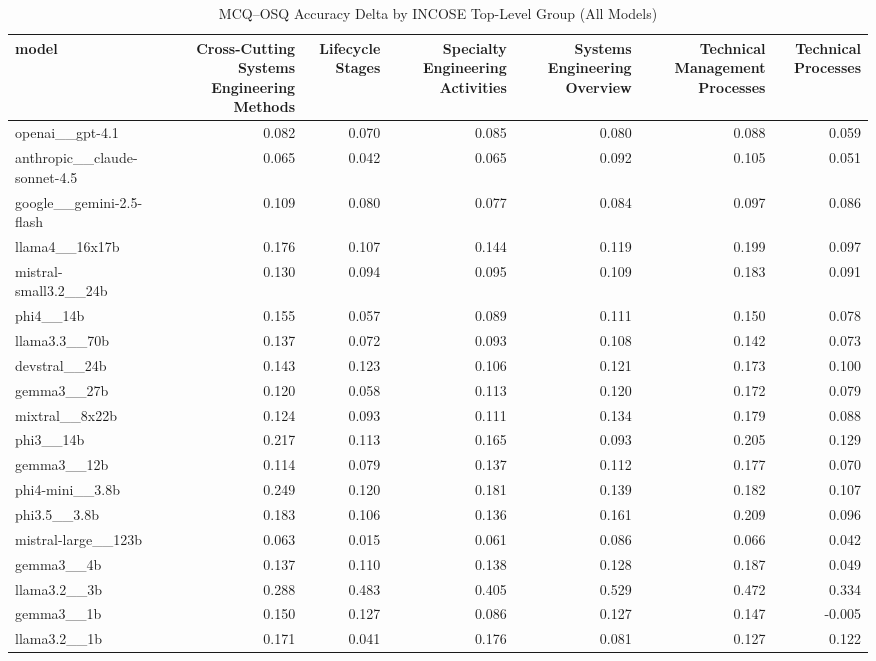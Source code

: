 \begin{table}
\caption{MCQ--OSQ Accuracy Delta by INCOSE Top-Level Group (All Models)}
\label{tab:mcq_osq_delta_toplevel}
\begin{tabular}{lrrrrrr}
\toprule
model & Cross-Cutting Systems Engineering Methods & Lifecycle Stages & Specialty Engineering Activities & Systems Engineering Overview & Technical Management Processes & Technical Processes \\
\midrule
openai\_\_gpt-4.1 & 0.082 & 0.070 & 0.085 & 0.080 & 0.088 & 0.059 \\
anthropic\_\_claude-sonnet-4.5 & 0.065 & 0.042 & 0.065 & 0.092 & 0.105 & 0.051 \\
google\_\_gemini-2.5-flash & 0.109 & 0.080 & 0.077 & 0.084 & 0.097 & 0.086 \\
llama4\_\_16x17b & 0.176 & 0.107 & 0.144 & 0.119 & 0.199 & 0.097 \\
mistral-small3.2\_\_24b & 0.130 & 0.094 & 0.095 & 0.109 & 0.183 & 0.091 \\
phi4\_\_14b & 0.155 & 0.057 & 0.089 & 0.111 & 0.150 & 0.078 \\
llama3.3\_\_70b & 0.137 & 0.072 & 0.093 & 0.108 & 0.142 & 0.073 \\
devstral\_\_24b & 0.143 & 0.123 & 0.106 & 0.121 & 0.173 & 0.100 \\
gemma3\_\_27b & 0.120 & 0.058 & 0.113 & 0.120 & 0.172 & 0.079 \\
mixtral\_\_8x22b & 0.124 & 0.093 & 0.111 & 0.134 & 0.179 & 0.088 \\
phi3\_\_14b & 0.217 & 0.113 & 0.165 & 0.093 & 0.205 & 0.129 \\
gemma3\_\_12b & 0.114 & 0.079 & 0.137 & 0.112 & 0.177 & 0.070 \\
phi4-mini\_\_3.8b & 0.249 & 0.120 & 0.181 & 0.139 & 0.182 & 0.107 \\
phi3.5\_\_3.8b & 0.183 & 0.106 & 0.136 & 0.161 & 0.209 & 0.096 \\
mistral-large\_\_123b & 0.063 & 0.015 & 0.061 & 0.086 & 0.066 & 0.042 \\
gemma3\_\_4b & 0.137 & 0.110 & 0.138 & 0.128 & 0.187 & 0.049 \\
llama3.2\_\_3b & 0.288 & 0.483 & 0.405 & 0.529 & 0.472 & 0.334 \\
gemma3\_\_1b & 0.150 & 0.127 & 0.086 & 0.127 & 0.147 & -0.005 \\
llama3.2\_\_1b & 0.171 & 0.041 & 0.176 & 0.081 & 0.127 & 0.122 \\
\bottomrule
\end{tabular}
\end{table}
